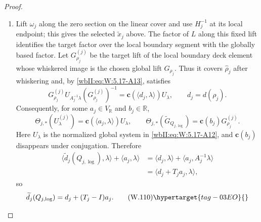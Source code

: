 \begin{proof}
\begin{enumerate}[label=\arabic*.,leftmargin=*]
\[
\begin{aligned}
 p_{j,\log}\circ\widetilde\gamma_{j,\log}
  &=\gamma_j^N,\\
 \widetilde\gamma_{j,\log}(0)&=x_j,\\
 \widetilde\gamma_{j,\log}(1)&=q_{j,\log}(x_j).
\end{aligned}
\]
Let $\widetilde\gamma_{j,\mathrm{vec}}$ be the $r_j^*$-lift of
$\widetilde\gamma_{j,\log}$ beginning at the selected $\widetilde x_j$.
For the clockwise lift, $\alpha_1=\alpha_0-1/m_j$.  Writing
$\zeta_0=-\alpha_0\Pi(s_j)v_j$, period equivariance and $A_jv_j=v_j$ give
\[
 \zeta_1=-(\alpha_0-1/m_j)\Pi(g_js_j)v_j
 =R_{g_j}(s_j)\zeta_0+\Pi(g_js_j)v_j/m_j.
\]
By , this gives
\[
 \widetilde\gamma_{j,\mathrm{vec}}(1)
 =Q_{j,\log}(\widetilde x_j),
\]
for this selected vector lift.
Fibre loops remain \(\tau_\lambda\), since \(h_j\) is a fibre translation.

\item Lift $\omega_j$ along the zero section on the linear cover and use
$H_j^{-1}$ at its local endpoint; this gives the selected
$\widetilde x_j$ above.  The factor of $L$ along this fixed lift identifies the
target factor over the local boundary segment with the globally based
factor.  Let \(G_{\rho_j}^{(j)}\) be the target lift of the local boundary
deck element whose whiskered image is the chosen global lift
\(G_{\rho_j}\).  Thus it covers \(\widehat\rho_j\) after whiskering and,
by \eqref{wbII:eq:W:5.17-A13}, satisfies
\[
 G_{\rho_j}^{(j)}U_{A_j^{-1}\lambda}(G_{\rho_j}^{(j)})^{-1}
 =\mathbf c(\langle d_j,\lambda\rangle)U_\lambda,
 \qquad d_j=d(\rho_j).
\]
Consequently, for some
\(a_j\in V_{\mathbb R}\) and \(b_j\in\mathbb R\),
\[
 \Theta_{j,*}(U_\lambda^{(j)})
 =\mathbf c(\langle a_j,\lambda\rangle)U_\lambda,
 \qquad
 \Theta_{j,*}(\widetilde G_{Q_{j,\log}})
 =\mathbf c(b_j)G_{\rho_j}^{(j)}.
\]
Here \(U_\lambda\) is the normalized global system in \eqref{wbII:eq:W:5.17-A12}, and
\(\mathbf c(b_j)\) disappears under conjugation.
Therefore
\[
\begin{aligned}
 \langle\widetilde d_j(Q_{j,\log}),\lambda\rangle
 +\langle a_j,\lambda\rangle
 &=\langle d_j,\lambda\rangle
   +\langle a_j,A_j^{-1}\lambda\rangle\\
 &=\langle d_j+T_ja_j,\lambda\rangle,
\end{aligned}
\]
so
\[
 \widetilde d_j(Q_{j,\log})=d_j+(T_j-I)a_j.
\tag{W.110}\hypertarget{tag-03EO}{}\label{wbII:eq:W:5.17-A14e}
\]


\end{enumerate}
\end{proof}
